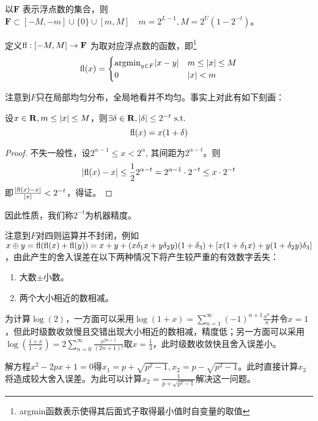 \documentclass{ctexart}
\begin{document}
以$\mathbf{F}$ 表示浮点数的集合，则$\mathbf{F}\subset [-M,-m]\cup\{0\}\cup[m,M]\quad m=2^{L-1},M=2^U(1-2^{-t})$。

定义$\mathrm{fl}:[-M,M]\to \mathbf{F}$ 为取对应浮点数的函数，即\footnote{argmin函数表示使得其后面式子取得最小值时自变量的取值}
\[\mathrm{fl}(x)=\begin{cases}
\mathrm{argmin}_{y\in F}|x-y|& m\leq |x|\leq M\\
0 &|x|<m
\end{cases}\]

注意到$F$只在局部均匀分布，全局地看并不均匀。事实上对此有如下刻画：
\begin{Thm}
设$x\in \mathbf{R}, m\leq |x|\leq M$，则$\exists \delta\in \mathbf{R}, |\delta|\leq 2^{-t}\text{ s.t. }$
\[\mathrm{fl}(x)=x(1+\delta)\]
\end{Thm}
\begin{proof}
不失一般性，设$2^{\alpha-1}\leq x<2^\alpha$, 其间距为$2^{\alpha-t}$。则
\[|\mathrm{fl}(x)-x|\leq \frac{1}{2}2^{\alpha-t}=2^{\alpha-1}\cdot 2^{-t}\leq x\cdot 2^{-t}\]
即$\frac{|\mathrm{fl}(x)-x|}{|x|}<2^{-t}$，得证。
\end{proof}
因此性质，我们称$2^{-t}$为机器精度。

注意到$F$对四则运算并不封闭，例如$x\oplus y=\mathrm{fl}(\mathrm{fl}(x)+\mathrm{fl}(y))=x+y+(x\delta_1x+y\delta_2y)(1+\delta_3)+[x(1+\delta_1x)+y(1+\delta_2y)\delta_3]$，由此产生的舍入误差在以下两种情况下将产生较严重的有效数字丢失：
\begin{enumerate}
\item 大数$\pm$小数。
\item 两个大小相近的数相减。
\end{enumerate}

\begin{Eg}
为计算$\log(2)$，一方面可以采用$\log(1+x)=\sum\limits_{n=1}^\infty (-1)^{n+1}\frac{x^n}{n}$并令$x=1$，但此时级数收敛慢且交错出现大小相近的数相减，精度低；另一方面可以采用$\log(\frac{1+x}{1-x})=2\sum\limits_{n=0}^\infty \frac{x^{2n+1}}{(2n+1)!}$取$x=\frac{1}{3}$，此时级数收敛快且舍入误差小。
\end{Eg}

\begin{Eg}
解方程$x^2-2px+1=0$得$x_1=p+\sqrt{p^2-1},x_2=p-\sqrt{p^2-1}$。此时直接计算$x_2$将造成较大舍入误差。为此可以计算$x_2=\frac{1}{p+\sqrt{p^2-1}}$解决这一问题。
\end{Eg}
\end{document}
